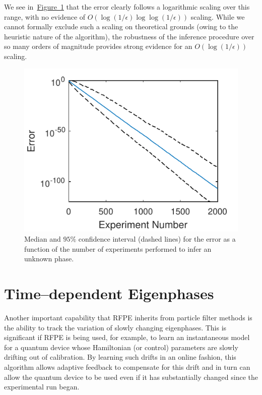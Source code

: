 \documentclass[aps,pra,amsmath,twocolumn,amssymb,superscriptaddress]{revtex4-1}
\newcommand{\fig}[1]{\hyperref[fig:#1]{Figure~\ref*{fig:#1}}}
\begin{document}
We see in~\fig{small} that the error clearly follows a logarithmic scaling over this range, with no evidence of $O(\log(1/\epsilon)\log\log(1/\epsilon))$ scaling.  While we cannot formally
exclude such a scaling on theoretical grounds (owing to the heuristic nature of the algorithm), the robustness of the inference procedure over so many orders of magnitude provides
strong evidence for an $O(\log(1/\epsilon))$ scaling.


\begin{figure}[t!]
\includegraphics{longPE.pdf}
\caption{Median and $95\%$ confidence interval (dashed lines) for the error as a function of the number of experiments performed to infer an unknown phase.}\label{fig:small}
\end{figure}

\section{Time--dependent Eigenphases}
\label{app:timedep}
Another important capability that RFPE inherits from particle filter methods is the ability to track the variation of slowly changing eigenphases.
This is significant if RFPE is being used, for example, to learn an instantaneous model for a quantum device whose Hamiltonian (or control) parameters
are slowly drifting out of calibration.  By learning such drifts in an online fashion, this algorithm allows adaptive feedback to compensate for this
drift and in turn can allow the quantum device to be used even if it has substantially changed since the experimental run began.
\end{document}
